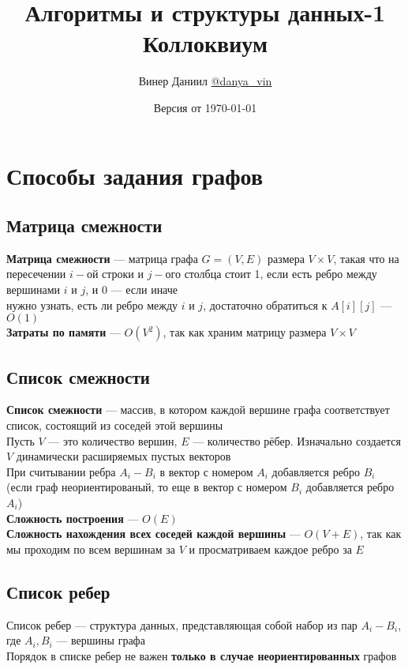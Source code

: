 \documentclass[a4paper]{article}
\begin{document}
\title{\LARGE{Алгоритмы и структуры данных-1}\\ Коллоквиум}
\author{Винер Даниил \href{https://t.me/danya_vin}{@danya\_vin}}
\date{Версия от \today}
\maketitle
\tableofcontents
\newpage
\section{Способы задания графов}
\subsection{Матрица смежности}
\textbf{Матрица смежности} — матрица графа $G=(V,E)$ размера $V\times V$, такая что на пересечении $i-$ой строки и $j-$ого столбца стоит 1, если есть ребро между вершинами $i$ и $j$, и 0 — если иначе\\[2mm]
 нужно узнать, есть ли ребро между \(i\) и \(j\), достаточно обратиться к \(A[i][j]\) — $O(1)$\\[2mm]
\indent\textbf{Затраты по памяти} — $O(V^2)$, так как храним матрицу размера $V\times V$

\subsection{Список смежности}
\textbf{Список смежности} — массив, в котором каждой вершине графа соответствует список, состоящий из соседей этой вершины\\[2mm]
\indent Пусть $V$ — это количество вершин, $E$ — количество рёбер. Изначально создается $V$ динамически расширяемых пустых векторов\\[2mm]
\indent При считывании ребра $A_i-B_i$ в вектор с номером $A_i$ добавляется ребро $B_i$ (если граф неориентированый, то еще в вектор с номером $B_i$ добавляется ребро $A_i$)\\[2mm]
\indent\textbf{Сложность построения} — $O(E)$\\[2mm]
\indent\textbf{Сложность нахождения всех соседей каждой вершины} — $O(V+E)$, так как мы проходим по всем вершинам за $V$ и просматриваем каждое ребро за $E$

\subsection{Список ребер}
 Список ребер — структура данных, представляющая собой набор из пар $A_i-B_i$, где $A_i,B_i$ — вершины графа\\[2mm]
\indent Порядок в списке ребер не важен \textbf{только в случае неориентированных} графов
\end{document}
